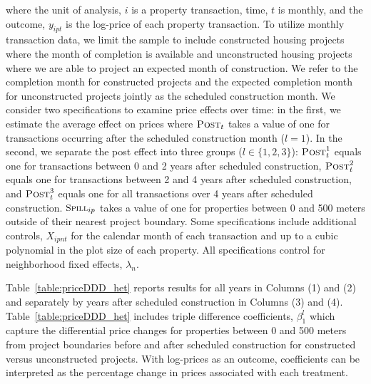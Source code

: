 \documentclass[12pt]{article}
\begin{document}
\noindent where the unit of analysis, $i$ is a property transaction, time, $t$ is monthly, and the outcome, $y_{ipt}$ is the log-price of each property transaction.  To utilize monthly transaction data, we limit the sample to include constructed housing projects where the month of completion is available and unconstructed housing projects where we are able to project an expected month of construction.  We refer to the completion month for constructed projects and the expected completion month for unconstructed projects jointly as the scheduled construction month.  We consider two specifications to examine price effects over time:  in the first, we estimate the average effect on prices where $\textsc{Post}_{t}$ takes a value of one for transactions occurring after the scheduled construction month ($l=1$).  In the second, we separate the post effect into three groups ($l\in \{1,2,3\}$):  $\textsc{Post}^{1}_{t}$ equals one for transactions between 0 and 2 years after scheduled construction, $\textsc{Post}^{2}_{t}$ equals one for transactions between 2 and 4 years after scheduled construction, and $\textsc{Post}^{3}_{t}$ equals one for all transactions over 4 years after scheduled construction.  $\textsc{\small Spill}_{ip}$ takes a value of one for properties between 0 and 500 meters outside of their nearest project boundary.  Some specifications include additional controls, $X_{ipnt}$ for the calendar month of each transaction and up to a cubic polynomial in the plot size of each property.  All specifications control for neighborhood fixed effects, $\lambda_n$.  %

Table~\ref{table:priceDDD_het} reports results for all years in Columns (1) and (2) and separately by years after scheduled construction in Columns (3) and (4).  Table~\ref{table:priceDDD_het} includes triple difference coefficients, $\beta_1^{l}$ which capture the differential price changes for properties between 0 and 500 meters from project boundaries before and after scheduled construction for constructed versus unconstructed projects.  With log-prices as an outcome, coefficients can be interpreted as the percentage change in prices associated with each treatment.
\end{document}
